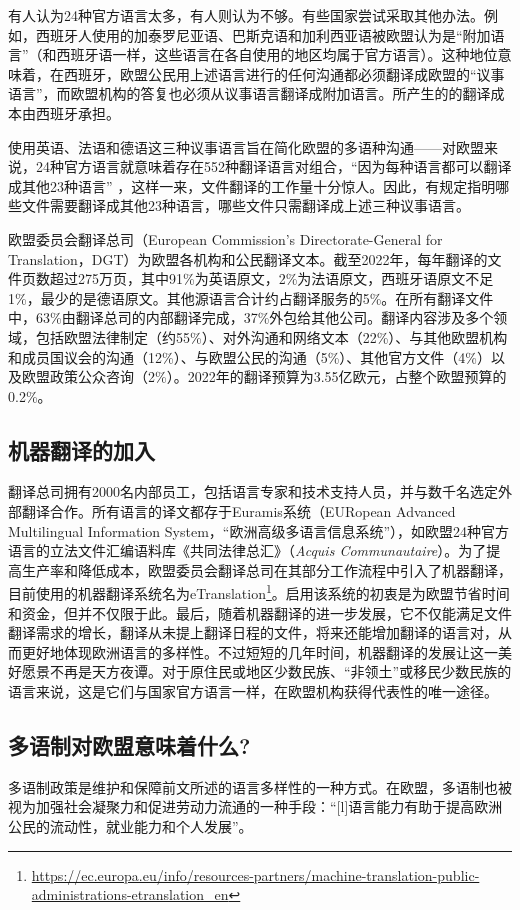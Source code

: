 \documentclass[output=paper]{langscibook}
\begin{document}
‌有人认为24种官方语言太多，有人则认为不够。‌有些国家尝试采取其他办法。‌例如，西班牙人使用的加泰罗尼亚语、巴斯克语和加利西亚语被欧盟认为是“附加语言”（和西班牙语一样，这些语言在各自使用的地区均属于官方语言）。‌这种地位意味着，在西班牙，欧盟公民用上述语言进行的任何沟通都必须翻译成欧盟的“议事语言”，而欧盟机构的答复也必须从议事语言翻译成附加语言。所产生的的翻译成本由西班牙承担。

‌使用英语、法语和德语这三种议事语言旨在简化欧盟的多语种沟通——对欧盟来说，24种官方语言就意味着存在552种翻译语言对组合，“因为每种语言都可以翻译成其他23种语言”\citep{EuropeanParliament2020} ，这样一来，文件翻译的工作量十分惊人。‌因此，有规定指明哪些文件需要翻译成其他23种语言，哪些文件只需翻译成上述三种议事语言。

‌欧盟委员会翻译总司（European Commission’s Directorate-General for Translation，DGT）为欧盟各机构和公民翻译文本。‌截至2022年，每年翻译的文件页数超过275万页，其中91\%为英语原文，2\%为法语原文，西班牙语原文不足1\%，最少的是德语原文。‌其他源语言合计约占翻译服务的5\%。‌在所有翻译文件中，63\%由翻译总司的内部翻译完成，37\%外包给其他公司。‌翻译内容涉及多个领域，包括欧盟法律制定（约55\%）、对外沟通和网络文本（22\%）、与其他欧盟机构和成员国议会的沟通（12\%）、与欧盟公民的沟通（5\%）、其他官方文件（4\%）以及欧盟政策公众咨询（2\%）。‌2022年的翻译预算为3.55亿欧元，占整个欧盟预算的0.2\%\citep{DGT2022}。


\subsection{‌机器翻译的加入}
‌翻译总司拥有2000名内部员工，包括语言专家和技术支持人员，并与数千名选定外部翻译合作\citep{DGT2022}。‌所有语言的译文都存于Euramis系统（EURopean
Advanced Multilingual Information System，“欧洲高级多语言信息系统”），如欧盟24种官方语言的立法文件汇编语料库《共同法律总汇》（\textit{Acquis Communautaire}）。为了提高生产率和降低成本，欧盟委员会翻译总司在其部分工作流程中引入了机器翻译，目前使用的机器翻译系统名为eTranslation\footnote{\url{https://ec.europa.eu/info/resources-partners/machine-translation-public-administrations-etranslation_en}}。启用该系统的初衷是为欧盟节省时间和资金，但并不仅限于此。‌最后，随着机器翻译的进一步发展，它不仅能满足文件翻译需求的增长，翻译从未提上翻译日程的文件，将来还能增加翻译的语言对，从而更好地体现欧洲语言的多样性。不过短短的几年时间，机器翻译的发展让这一美好愿景不再是天方夜谭。‌对于原住民或地区少数民族、“非领土”或移民少数民族的语言来说，这是它们与国家官方语言一样，在欧盟机构获得代表性的唯一途径。

\subsection{多语制对欧盟意味着什么?}
多语制政策是维护和保障前文所述的语言多样性的一种方式。‌在欧盟，多语制也被视为加强社会凝聚力和促进劳动力流通的一种手段：‌“[l]语言能力有助于提高欧洲公民的流动性，就业能力和个人发展”\citep{CounciloftheEU2014}。
\end{document}
